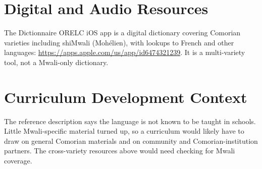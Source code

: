 \documentclass[12pt]{article}
\begin{document}
\section{Digital and Audio Resources}
The Dictionnaire ORELC iOS app is a digital dictionary covering Comorian varieties including shiMwali (Mohélien), with lookups to French and other languages: \url{https://apps.apple.com/us/app/id6474321239}. It is a multi-variety tool, not a Mwali-only dictionary.

\section{Curriculum Development Context}
The reference description says the language is not known to be taught in schools. Little Mwali-specific material turned up, so a curriculum would likely have to draw on general Comorian materials and on community and Comorian-institution partners. The cross-variety resources above would need checking for Mwali coverage.
\end{document}
